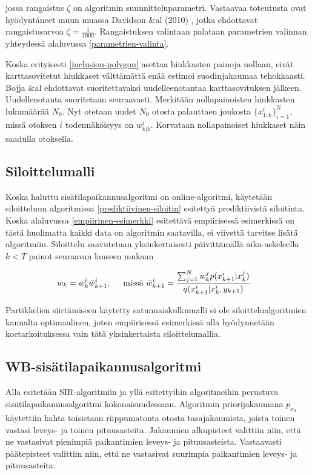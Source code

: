 \documentclass[
  12pt,
  a4paper, twoside]{book}
\begin{document}
jossa rangaistus \(\zeta\) on algoritmin suunnitteluparametri. Vastaavaa toteutusta ovat hyödyntäneet muun muassa Davidson \&al (2010) \citep{Davidson-2010}, jotka ehdottavat rangaistusarvoa \(\zeta=\frac{1}{1000}\). Rangaistuksen valintaan palataan parametrien valinnan yhteydessä alaluvussa \ref{parametrien-valinta}.

Koska erityisesti \ref{inclusion-polygon} asettaa hiukkasten painoja nollaan, eivät karttasovitetut hiukkaset välttämättä enää estimoi suodinjakaumaa tehokkaasti. Bojja \&al \citep{Bojja-2015} ehdottavat suoritettavaksi uudelleenotantaa karttasovituksen jälkeen. Uudellenotanta suoritetaan seuraavasti. Merkitään nollapainoisten hiukkasten lukumäärää \(N_0\). Nyt otetaan uudet \(N_0\) otosta palauttaen joukosta \(\{x_{1:k}^i\}_{i=1}^N\), missä otoksen \(i\) todennäköisyys on \(w^i_{k|k}\). Korvataan nollapainoiset hiukkaset näin saadulla otoksella.

\hypertarget{siloittelumalli}{%
\subsection{Siloittelumalli}\label{siloittelumalli}}

Koska haluttu sisätilapaikannusalgoritmi on online-algoritmi, käytetään siloitteluun algoritmissa \ref{prediktiivinen-siloitin} esitettyä prediktiivistä siloitinta. Koska alaluvussa \ref{empiirinen-esimerkki} esitettävä empiirisessä esimerkissä on tästä huolimatta kaikki data on algoritmin saatavilla, ei viivettä tarvitse lisätä algoritmiin. Siloittelu saavutetaan yksinkertaisesti päivittämällä aika-askeleella \(k < T\) painot seuraavan lauseen mukaan

\begin{align}
&w_k = w_k^i \bar{w}^i_{k+1}, \hspace{0.5cm} \text{missä } \bar{w}^i_{k+1} = \frac{\sum_{j=1}^{N}w_{k}^j p(x_{k+1}^i|x_k^j)}{q(x_{k+1}^i|x_k^i,y_{k+1})}
\end{align}

Partikkelien siirtämiseen käytetty satunnaiskulkumalli ei ole siloittelualgoritmien kannalta optimaalinen, joten empiirisessä esimerkissä alla hyödynnetään koetarkoituksessa vain tätä yksinkertaista siloittelumallia.

\subsection{WB-sisätilapaikannusalgoritmi}

Alla esitetään SIR-algoritmiin ja yllä esitettyihin algoritmeihin perustuva sisätilapaikannusalgoritmi kokonaisuudessaan. Algoritmin priorijakaumana \(p_{x_0}\) käytettiin kahta toisistaan riippumatonta otosta tasajakaumista, joista toinen vastasi leveys- ja toinen pituusasteita. Jakaumien alkupisteet valittiin niin, että ne vastasivat pienimpiä paikantimien leveys- ja pituusasteista. Vastaavasti päätepisteet valittiin niin, että ne vastasivat suurimpia paikantimien leveys- ja pituusasteita.
\end{document}
